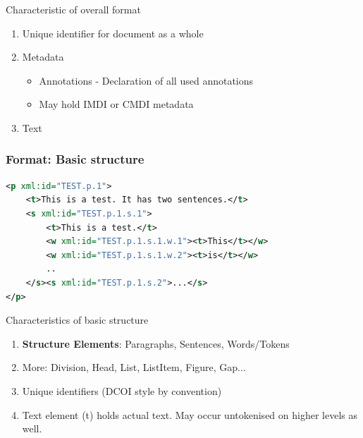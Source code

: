 \documentclass[compress]{beamer}
\begin{document}
\begin{frame}
    \begin{block}{Characteristic of overall format}
      \begin{enumerate}
        \item Unique identifier for document as a whole
        \item Metadata 
        \begin{itemize}
            \item Annotations - Declaration of all used annotations
            \item May hold IMDI or CMDI metadata
        \end{itemize}
        \item Text        
      \end{enumerate}
    \end{block}
\end{frame}



\begin{frame}[fragile]
\frametitle{Format: Basic structure}
\begin{lstlisting}[language=xml]
<p xml:id="TEST.p.1">
    <t>This is a test. It has two sentences.</t>
    <s xml:id="TEST.p.1.s.1">        
        <t>This is a test.</t>
        <w xml:id="TEST.p.1.s.1.w.1"><t>This</t></w>
        <w xml:id="TEST.p.1.s.1.w.2"><t>is</t></w>
        ..
    </s><s xml:id="TEST.p.1.s.2">...</s>                
</p>                
\end{lstlisting}
    
\end{frame}

\begin{frame}
    \begin{block}{Characteristics of basic structure}
      \begin{enumerate}
        \item \textbf{Structure Elements}: Paragraphs, Sentences, Words/Tokens  
        \item More: Division, Head, List, ListItem, Figure, Gap...
        \item Unique identifiers (DCOI style by convention)
        \item Text element (t) holds actual text. May occur untokenised on higher levels as well.
      \end{enumerate}
    \end{block}
\end{frame}
        
\end{document}
